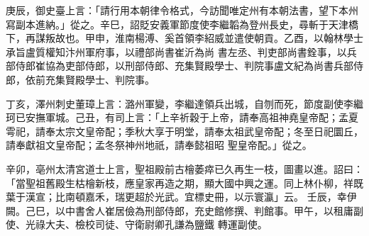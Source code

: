 \begin{pinyinscope}
 庚辰，御史臺上言：「請行用本朝律令格式，今訪聞唯定州有本朝法書，望下本州寫副本進納。」從之。辛巳，詔貶安義軍節度使李繼韜為登州長史，尋斬于天津橋下，再謀叛故也。甲申，淮南楊溥、奚首領李紹威並遣使朝貢。乙酉，以翰林學士承旨盧質權知汴州軍府事，以禮部尚書崔沂為尚
 書左丞、判吏部尚書銓事，以兵部侍郎崔協為吏部侍郎，以刑部侍郎、充集賢殿學士、判院事盧文紀為尚書兵部侍郎，依前充集賢殿學士、判院事。



 丁亥，澤州刺史董璋上言：潞州軍變，李繼達領兵出城，自刎而死，節度副使李繼珂已安撫軍城。己丑，有司上言：「上辛祈穀于上帝，請奉高祖神堯皇帝配；孟夏雩祀，請奉太宗文皇帝配；季秋大享于明堂，請奉太祖武皇帝配；冬至日祀圜丘，請奉獻祖文皇帝配；孟冬祭神州地祇，請奉懿祖昭
 聖皇帝配。」從之。


辛卯，亳州太清宮道士上言，聖祖殿前古檜萎瘁已久再生一枝，圖畫以進。詔曰：「當聖祖舊殿生枯檜新枝，應皇家再造之期，顯大國中興之運。同上林仆柳，祥既葉于漢宣；比南頓嘉禾，瑞更超於光武。宜標史冊，以示寰瀛」云。
 壬辰，幸伊闕。己巳，以中書舍人崔居儉為刑部侍郎，充史館修撰、判館事。甲午，以租庸副使、光祿大夫、檢校司徒、守衛尉卿孔謙為鹽鐵
 轉運副使。



\end{pinyinscope}